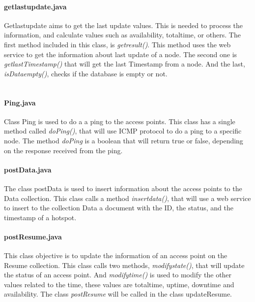 \documentclass[12pt, a4paper,twoside]{tesi_upf}
\begin{document}
                \paragraph{getlastupdate.java}
                
                Getlastupdate aims to get the last update values. This is needed to process the information, and calculate values such as availability, totaltime, or others. The first method included in this class, is \textit{getresult()}. This method uses the web service to get the information about last update of a node. The second one is \textit{getlastTimestamp()} that will get the last Timestamp from a node. And the last, \textit{isDataempty()}, checks if the database is empty or not.\\
                \\

                \paragraph{Ping.java}
                
                Class Ping is used to do a a ping to the access points. This class has a single method called \textit{doPing()}, that will use ICMP protocol to do a ping to a specific node. The method \textit{doPing} is a boolean that will return true or false, depending on the response received from the ping.\\
                
                \paragraph{postData.java}
                
                The class postData is used to insert information about the access points to the Data collection. This class calls a method \textit{insertdata()}, that will use a web service to insert to the collection Data a document with the ID, the status, and the timestamp of a hotspot. \\
                
                \paragraph{postResume.java}
                This class objective is to update the information of an access point on the Resume collection. This class calls two methods, \textit{modifystate()}, that will update the status of an access point. And \textit{modifytime()} is used to modify the other values related to the time, these values are totaltime, uptime, downtime and availability. The class \emph{postResume} will be called in the class updateResume.\\
                
\end{document}
